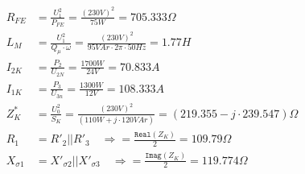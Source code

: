 \begin{align*}
R_{FE} &= \frac{U_1^2}{P_{FE}} = \frac{(230V)^2}{75W} = 705.333\Omega\\
L_M &= \frac{U_1^2}{Q_\mu\cdot \omega} = \frac{(230V)^2}{95VAr\cdot 2\pi\cdot 50Hz} = 1.77H\\
I_{2K} &=  \frac{P_2}{U_{2N}} = \frac{1700W}{24V} = 70.833A\\
I_{1K} &= \frac{P_3}{U_{3n}} = \frac{1300W}{12V} = 108.333A\\
Z_K^*&= \frac{U_0^2}{S_K} = \frac{(230V)^2}{(110W+ j\cdot 120 VAr)} = (219.355 -j\cdot 239.547)\Omega\\
R_1 &= R'_2\vert \vert R'_3\quad\Rightarrow = \frac{\texttt{Real}(Z_K)}{2} = 109.79\Omega\\
X_{\sigma 1}&= X'_{\sigma 2} \vert \vert X'_{\sigma 3}\quad \Rightarrow = \frac{\texttt{Imag}(Z_K)}{2} = 119.774\Omega\\
\end{align*}

\newpage




